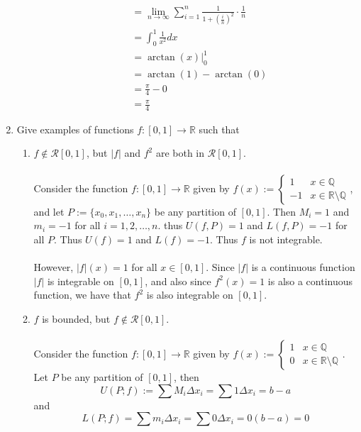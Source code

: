 \documentclass[12pt,letterpaper]{article}
\newcommand{\R}{\mathbb{R}}
\newcommand{\Q}{\mathbb{Q}}
\theoremstyle{case}
\theoremstyle{definition}
\begin{document}
\begin{enumerate}
\begin{enumerate}
\begin{align*}
				&= \lim\limits_{n \to \infty} \sum_{i=1}^{n} \frac{1}{1+(\frac{i}{n})^2} \cdot \frac{1}{n} \\
				&= \int_{0}^{1} \frac{1}{x^2} dx \\
				&= \arctan(x) |_0^1 \\
				&= \arctan(1)-\arctan(0) \\
				&= \frac{\pi}{4} - 0 \\
				&= \frac{\pi}{4}
			\end{align*}
		\end{enumerate}
		\item Give examples of functions $f:[0,1] \to \R$ such that
		\begin{enumerate}
			\item $f \notin \mathcal{R}[0,1]$, but $|f|$ and $f^2$ are both in $\mathcal{R}[0,1]$.
			\\\\Consider the function $f:[0,1] \to \R$ given by $f(x):=\begin{cases}
			1 &x \in \Q \\
			-1 &x \in \R\setminus\Q
			\end{cases}$, and let $P:=\{x_0,x_1,\dots, x_n\}$ be any partition of $[0,1]$. Then $M_i=1$ and $m_i=-1$ for all $i=1,2,\dots,n$. thus $U(f,P)=1$ and $L(f,P)=-1$ for all $P$. Thus $U(f)=1$ and $L(f)=-1$. Thus $f$ is not integrable.
			\\\\However, $|f|(x)=1$ for all $x \in [0,1]$. Since $|f|$ is a continuous function $|f|$ is integrable on $[0,1]$, and also since $f^2(x)=1$ is also a continuous function, we have that $f^2$ is also integrable on $[0,1]$.\\
			\item $f$ is bounded, but $f \notin \mathcal{R}[0,1]$.
			\\\\Consider the function $f:[0,1] \to \R$ given by $f(x):=\begin{cases}
			1 &x \in \Q \\
			0 &x \in \R\setminus\Q
			\end{cases}$. Let $P$ be any partition of $[0,1]$, then
			\[U(P;f):=\sum M_i \Delta x_i = \sum 1 \Delta x_i = b-a\]
			and
			\[L(P;f)=\sum m_i \Delta x_i = \sum 0 \Delta x_i = 0(b-a)=0\]

\end{enumerate}
\end{enumerate}
\end{document}

